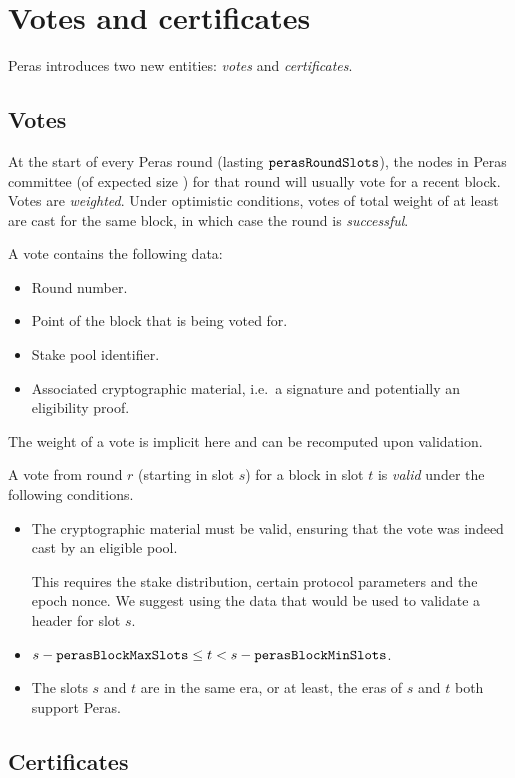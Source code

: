 \section{Votes and certificates}

Peras introduces two new entities: \emph{votes} and \emph{certificates}.

\subsection{Votes}

At the start of every Peras round (lasting $\mathtt{perasRoundSlots}$), the nodes in Peras committee (of expected size \perasN{}) for that round will usually vote for a recent block.
Votes are \emph{weighted}.
Under optimistic conditions, votes of total weight of at least \perasQuorum{} are cast for the same block, in which case the round is \emph{successful}.

A vote contains the following data:
\begin{itemize}
\item Round number.
\item Point of the block that is being voted for.
\item Stake pool identifier.
\item Associated cryptographic material, i.e.\ a signature and potentially an eligibility proof.
\end{itemize}
The weight of a vote is implicit here and can be recomputed upon validation.

A vote from round $r$ (starting in slot $s$) for a block in slot $t$ is \emph{valid} under the following conditions.
\begin{itemize}
\item
  The cryptographic material must be valid, ensuring that the vote was indeed cast by an eligible pool.

  This requires the stake distribution, certain protocol parameters and the epoch nonce.
  We suggest using the data that would be used to validate a header for slot $s$.
\item
  $s - \mathtt{perasBlockMaxSlots} \le t < s - \mathtt{perasBlockMinSlots}$.
\item
  The slots $s$ and $t$ are in the same era, or at least, the eras of $s$ and $t$ both support Peras.
\end{itemize}

\subsection{Certificates}

